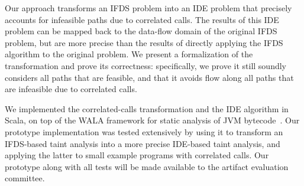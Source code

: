 %

Our approach transforms an IFDS problem into an
IDE problem that precisely accounts for infeasible paths due to correlated calls. 
The results of this IDE problem can be mapped back to the data-flow domain of the 
original IFDS problem, but are more precise than the results of directly applying
the IFDS algorithm to the original problem.
%
We present a formalization of the transformation and prove its correctness:
specifically, we prove it still soundly considers all paths that are feasible,
and that it avoids flow along all paths that are infeasible due to
correlated calls.

We implemented the correlated-calls transformation and the IDE algorithm in Scala,
on top of the WALA framework for static analysis of JVM bytecode~\cite{fink2012wala}.
Our prototype implementation was tested extensively by using it to transform an IFDS-based 
taint analysis into a more precise IDE-based taint analysis, and applying the latter
to small example programs with correlated calls. Our prototype along with all tests
will be made available to the artifact evaluation committee.

%

